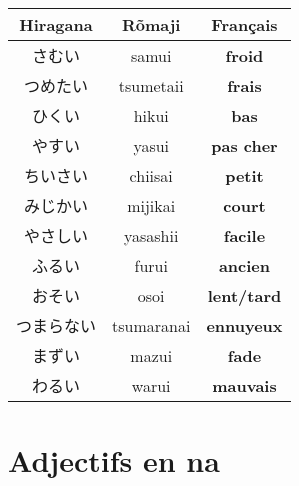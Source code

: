 \documentclass[11pt]{report}
\newenvironment{Japanese}{%
\CJKfamily{min}%
\CJKtilde  
\CJKnospace}{}
\begin{document}
\begin{CJK}{UTF8}{}
\begin{Japanese}
\begin{center}
\begin{multicols}{2}
\begin{tabular}{|c|c|c|}
			\end{tabular}
			\begin{tabular}{|c|c|c|}
				\hline
				\textbf{Hiragana} & \textbf{Rõmaji} & \textbf{Français} \\
				\hline
				さむい & samui & \textbf{froid} \\%
				\hline
				つめたい & tsumetaii & \textbf{frais} \\%
				\hline
				ひくい & hikui & \textbf{bas} \\%
				\hline
				やすい & yasui & \textbf{pas cher} \\%
				\hline
				ちいさい & chiisai & \textbf{petit} \\%
				\hline
				みじかい & mijikai & \textbf{court} \\%
				\hline
				やさしい & yasashii & \textbf{facile} \\%
				\hline
				ふるい & furui & \textbf{ancien} \\%
				\hline
				おそい & osoi & \textbf{lent/tard} \\%
				\hline
				つまらない & tsumaranai & \textbf{ennuyeux} \\%
				\hline
				まずい & mazui & \textbf{fade} \\%
				\hline
				わるい & warui & \textbf{mauvais} \\%
				\hline
			\end{tabular}
		\end{multicols}
	\end{center}
\end{Japanese}  
\end{CJK}

\chapter{Adjectifs en na}

\begin{CJK}{UTF8}{}  
\begin{Japanese}
	\begin{center}
		\begin{tabular}{|c|c|c|}

		\end{tabular}
	\end{center}
\end{Japanese}  
\end{CJK}
\end{document}
